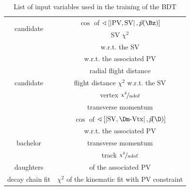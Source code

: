 \begin{table}[tbp]
	\centering
	\caption{List of input variables used in the training of the BDT}
	\begin{tabular}{cc}
		\toprule
		\multirow{2}{*}{\Bz candidate}	& $\cos$ of $\sphericalangle\left[\left|\text{PV},\text{SV}\right|,\vec{p}(\Bz)\right]$ \\
										& \ac{SV} $\chi^2$\\
		\midrule
		\multirow{7}{*}{\Dm candidate}	& \chisqip w.r.t. the \ac{SV}\\
										& \chisqip w.r.t. the associated PV\\
										& radial flight distance\\
										& flight distance $\chi^2$ w.r.t. the \ac{SV}\\
										& \Dm vertex $\nicefrac{\chi^2}{\text{ndof}}$\\
										& transverse momentum \pt \\
										& $\cos$ of $\sphericalangle\left[\left|\text{SV},\Dm\text{-Vtx}\right|,\vec{p}\!(\D)\right]$ \\
		\midrule
		\multirow{3}{*}{bachelor \pion}	& \chisqip w.r.t. the associated PV\\
										& transverse momentum \pt\\
										& track $\nicefrac{\chi^2}{\text{ndof}}$\\
		\midrule
		\Dm daughters					& \chisqip of the associated \ac{PV}\\
		\midrule
		decay chain fit					& $\chi^2$ of the kinematic fit with \ac{PV} constraint \\
		\bottomrule
	\end{tabular}
	\label{tab:BDTInput}
\end{table}
